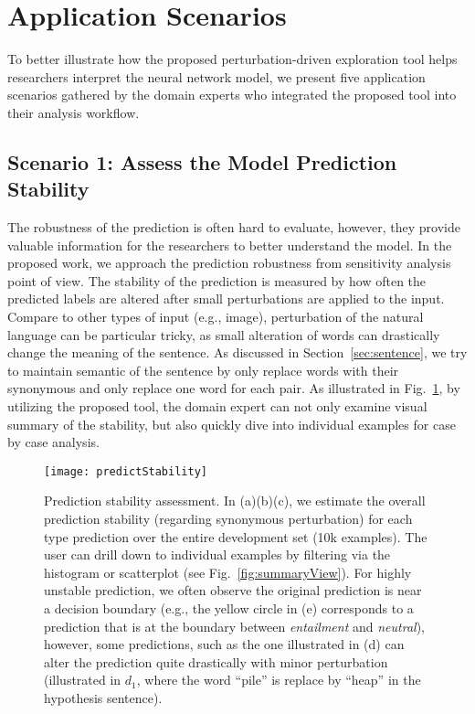 \section{Application Scenarios}
\label{sec:caseStudy}
To better illustrate how the proposed perturbation-driven exploration tool helps researchers interpret the neural network model, we present five application scenarios gathered by the domain experts who integrated the proposed tool into their analysis workflow.


\subsection{Scenario 1: Assess the Model Prediction Stability}
The robustness of the prediction is often hard to evaluate, however, they provide valuable information for the researchers to better understand the model.
%
In the proposed work, we approach the prediction robustness from sensitivity analysis point of view. The stability of the prediction is measured by how often the predicted labels are altered after small perturbations are applied to the input.
%
Compare to other types of input (e.g., image), perturbation of the natural language can be particular tricky, as small alteration of words can drastically change the meaning of the sentence. As discussed in Section~\ref{sec:sentence}, we try to maintain semantic of the sentence by only replace words with their synonymous and only replace one word for each pair.
As illustrated in Fig.~\ref{fig:predictStability}, by utilizing the proposed tool, the domain expert can not only examine visual summary of the stability, but also quickly dive into individual examples for case by case analysis.

\begin{figure}[htbp]
\centering
\vspace{-2mm}
 \texttt{[image: predictStability]}
 \vspace{-4mm}
 \caption{
Prediction stability assessment. In (a)(b)(c), we estimate the overall prediction stability (regarding synonymous perturbation) for each type prediction over the entire development set (10k examples). The user can drill down to individual examples by filtering via the histogram or scatterplot (see Fig.~\ref{fig:summaryView}). For highly unstable prediction, we often observe the original prediction is near a decision boundary (e.g., the yellow circle in (e) corresponds to a prediction that is at the boundary between \emph{entailment} and \emph{neutral}), however, some predictions, such as the one illustrated in (d) can alter the prediction quite drastically with minor perturbation (illustrated in $d_1$, where the word ``pile'' is replace by ``heap'' in the hypothesis sentence).
}
\label{fig:predictStability}
\vspace{-2mm}
\end{figure}

